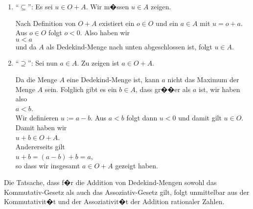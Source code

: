 \begin{enumerate}
\item ``$\subseteq$'': Es sei $u \in O + A$.  Wir m�ssen $u \in A$ zeigen.

      Nach Definition von $O + A$ existiert ein $o \in O$
      und ein $a \in A$ mit $u = o + a$.  Aus $o \in O$ folgt $o < 0$.  Also haben wir
      \\[0.2cm]
      \hspace*{1.3cm}
      $u < a$
      \\[0.2cm]
      und da $A$ als Dedekind-Menge nach unten abgeschlossen ist, folgt $u \in A$.
\item ``$\supseteq$'': Sei nun $a \in A$.  Zu zeigen ist $a \in O + A$.

      Da die Menge $A$ eine Dedekind-Menge ist, kann $a$ nicht das Maximum der Menge $A$ sein.
      Folglich gibt es ein $b \in A$, dass gr��er als $a$ ist, wir haben also
      \\[0.2cm]
      \hspace*{1.3cm}
      $a < b$.
      \\[0.2cm]
      Wir definieren $u := a - b$.  Aus $a < b$ folgt dann $u < 0$ und damit gilt $u \in O$.
      Damit haben wir
      \\[0.2cm]
      \hspace*{1.3cm}
      $u + b \in O + A$.
      \\[0.2cm]
      Andererseits gilt
      \\[0.2cm]
      \hspace*{1.3cm}
      $u + b = (a - b) + b = a$,
      \\[0.2cm]
      so dass wir insgesamt $a \in O + A$ gezeigt haben.
\end{enumerate}
Die Tatsache, dass f�r die Addition von Dedekind-Mengen sowohl das Kommutativ-Gesetz als auch das
Assoziativ-Gesetz gilt, folgt unmittelbar aus der Kommutativit�t und der Assoziativit�t der Addition
rationaler Zahlen.

